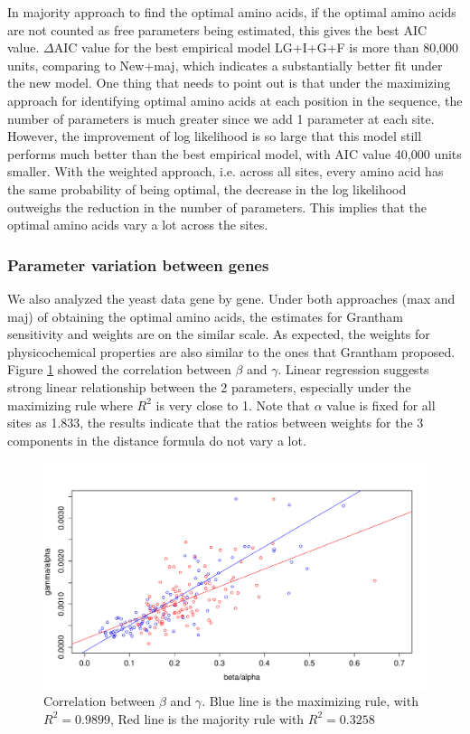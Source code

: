 In majority approach to find the optimal amino acids, if the optimal amino acids are not counted as free parameters being estimated, this gives the best AIC value. $\Delta$AIC value for the best empirical model LG+I+G+F is more than 80,000 units, comparing to New+maj, which indicates a substantially better fit under the new model.
One thing that needs to point out is that under the maximizing approach for identifying optimal amino acids at each position in the sequence, the number of parameters is much greater since we add 1 parameter at each site.
However, the improvement of log likelihood is so large that this model still performs much better than the best empirical model, with AIC value 40,000 units smaller.
With the weighted approach, i.e. across all sites, every amino acid has the same probability of being optimal, the decrease in the log likelihood outweighs the reduction in the number of parameters.
This implies that the optimal amino acids vary a lot across the sites. 

\subsubsection{Parameter variation between genes}
We also analyzed the yeast data gene by gene.
Under both approaches  (max and maj) of obtaining the optimal amino acids, the estimates for Grantham sensitivity and weights are on the similar scale.
As expected, the weights for physicochemical properties are also similar to the ones that Grantham proposed.
Figure \ref{fig:correlation} showed the correlation between $\beta$ and $\gamma$.
Linear regression suggests strong linear relationship between the 2 parameters, especially under the maximizing rule where $R^2$ is very close to 1.
Note that $\alpha$ value is fixed for all sites as 1.833, the results indicate that the ratios between weights for the 3 components in the distance formula do not vary a lot.\\

\begin{figure}[h]
\centering
\includegraphics[width=\textwidth]{GMmaxmaj.pdf}
\caption{Correlation between $\beta$ and $\gamma$.
Blue line is the maximizing rule, with $R^2 = 0.9899$, Red line is the majority rule with $R^2 = 0.3258$}
\label{fig:correlation}
\end{figure}

